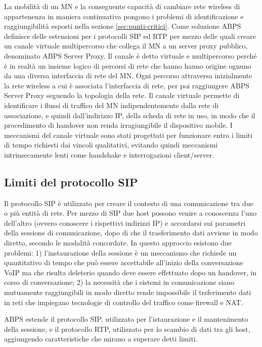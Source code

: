 \documentclass[12pt,a4paper,openright,twoside]{book}
\begin{document}
La mobilità di un MN e la conseguente capacità di cambiare rete
wireless di appartenenza in maniera continuativa pongono i problemi di
identificazione e raggiungibilità esposti nella sezione
\ref{sec:punti-critici}. Come soluzione ABPS definisce delle
estensioni per i protocolli SIP ed RTP per mezzo delle quali creare un
canale virtuale multipercorso che collega il MN a un server proxy
pubblico, denominato ABPS Server Proxy. Il canale è detto virtuale e
multipercorso perché è in realtà un insieme logico di percorsi di rete
che hanno hanno origine ognuno da una diversa interfaccia di rete del
MN. Ogni percorso attraversa inizialmente la rete wireless a cui è
associata l'interfaccia di rete, per poi raggiungere ABPS Server Proxy
seguendo la topologia della rete. Il canale virtuale permette di
identificare i flussi di traffico del MN indipendentemente dalla rete
di associazione, e quindi dall'indirizzo IP, della scheda di rete in
uso, in modo che il procedimento di handover non renda irragiungibile
il dispositivo mobile. I meccanismi del canale virtuale sono stati
progettati per funzionare entro i limiti di tempo richiesti dai
vincoli qualitativi, evitando quindi meccanismi intrinsecamente lenti
come handshake e interrogazioni client/server.

\subsection{Limiti del protocollo SIP}

Il protocollo SIP è utilizzato per creare il contesto di una
comunicazione tra due o più entità di rete. Per mezzo di SIP due host
possono venire a conoscenza l'uno dell'altro (ovvero conoscere i
rispettivi indirizzi IP) e accordarsi sui parametri della sessione di
comunicazione, dopo di che il trasferimento dati avviene in modo
diretto, secondo le modalità concordate. In questo approccio esistono
due problemi: 1) l'instaurazione della sessione è un meccanismo che
richiede un quantitativo di tempo che può essere accettabile
all'inizio della conversazione VoIP ma che risulta deleterio quando
deve essere effettuato dopo un handover, in corso di conversazione; 2)
la necessità che i sistemi in comunicazione siano mutuamente
raggiungibili in modo diretto rende impossibile il trsferimento dati
in reti che impiegano tecnologie di controllo del traffico come
firewall e NAT.

ABPS estende il protocollo SIP, utilizzato per l'istaurazione e il
mantenimento della sessione, e il protocollo RTP, utilizzato per lo
scambio di dati tra gli host, aggiungendo caratteristiche che mirano a
superare detti limiti.
\end{document}
